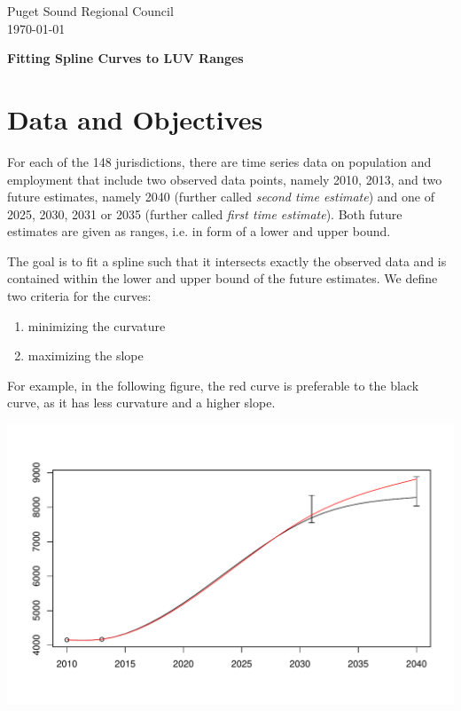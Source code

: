 \documentclass[11pt]{article}
\begin{document}
\begin{flushleft}
Puget Sound Regional Council\\
\today
\end{flushleft}

\vspace{1cm}
\begin{center}
{\Large \bf Fitting Spline Curves to LUV Ranges} 
\end{center}
%
\section{Data and Objectives}
%
For each of the 148 jurisdictions, there are time series data on population and employment that include two observed data points, namely 2010, 2013, and two future estimates, namely 2040 (further called {\em second time estimate}) and one of 2025, 2030, 2031 or 2035 (further called {\em first time  estimate}). Both future estimates are given as ranges, i.e. in form of a lower and upper bound.

The goal is to fit a spline such that it intersects exactly the observed data and is contained within the lower and upper bound of the future estimates. We define two criteria for the curves:
\begin{enumerate}
\item minimizing the curvature
\item maximizing the slope
\end{enumerate}
For example, in the following figure, the red curve is preferable to the black curve, as it has less curvature and a higher slope.
\begin{center}
\includegraphics[scale=0.5]{methexamplecurves.pdf}
\end{center}
\end{document}
